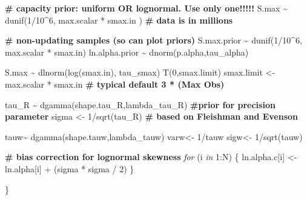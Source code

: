 \documentclass[french,11pt]{book}
\newenvironment{Shaded}{\begin{snugshade}}{\end{snugshade}}
\newcommand{\CommentTok}[1]{\textcolor[rgb]{0.56,0.35,0.01}{\textbf{#1}}}
\newcommand{\ControlFlowTok}[1]{\textcolor[rgb]{0.13,0.29,0.53}{\textit{#1}}}
\newcommand{\DecValTok}[1]{\textcolor[rgb]{0.00,0.00,0.81}{#1}}
\newcommand{\FunctionTok}[1]{\textcolor[rgb]{0.00,0.00,0.00}{#1}}
\newcommand{\NormalTok}[1]{#1}
\newcommand{\OtherTok}[1]{\textcolor[rgb]{0.56,0.35,0.01}{#1}}
\newcommand{\SpecialCharTok}[1]{\textcolor[rgb]{0.00,0.00,0.00}{#1}}
\begin{document}
\begin{Shaded}
\begin{Highlighting}[]
    \CommentTok{\# capacity prior: uniform OR lognormal. Use only one!!!!!}
\NormalTok{   S.max }\SpecialCharTok{\textasciitilde{}} \FunctionTok{dunif}\NormalTok{(}\DecValTok{1}\SpecialCharTok{/}\DecValTok{10}\SpecialCharTok{\^{}}\DecValTok{6}\NormalTok{, max.scalar }\SpecialCharTok{*}\NormalTok{ smax.in )  }\CommentTok{\# data is in millions}
    
    \CommentTok{\# non{-}updating samples (so can plot priors)}
\NormalTok{    S.max.prior }\SpecialCharTok{\textasciitilde{}} \FunctionTok{dunif}\NormalTok{(}\DecValTok{1}\SpecialCharTok{/}\DecValTok{10}\SpecialCharTok{\^{}}\DecValTok{6}\NormalTok{, max.scalar }\SpecialCharTok{*}\NormalTok{ smax.in)}
\NormalTok{    ln.alpha.prior }\SpecialCharTok{\textasciitilde{}} \FunctionTok{dnorm}\NormalTok{(p.alpha,tau\_alpha)}
    
\NormalTok{    S.max }\SpecialCharTok{\textasciitilde{}} \FunctionTok{dlnorm}\NormalTok{(}\FunctionTok{log}\NormalTok{(smax.in), tau\_smax) }\FunctionTok{T}\NormalTok{(}\DecValTok{0}\NormalTok{,smax.limit)}
\NormalTok{    smax.limit }\OtherTok{\textless{}{-}}\NormalTok{ max.scalar }\SpecialCharTok{*}\NormalTok{ smax.in }\CommentTok{\# typical default  3 * (Max Obs)}
    
\NormalTok{    tau\_R }\SpecialCharTok{\textasciitilde{}} \FunctionTok{dgamma}\NormalTok{(shape.tau\_R,lambda\_tau\_R)    }\CommentTok{\#prior for precision parameter}
\NormalTok{    sigma }\OtherTok{\textless{}{-}} \DecValTok{1}\SpecialCharTok{/}\FunctionTok{sqrt}\NormalTok{(tau\_R)          }\CommentTok{\# based on Fleishman and Evenson}

\NormalTok{    tauw}\SpecialCharTok{\textasciitilde{}} \FunctionTok{dgamma}\NormalTok{(shape.tauw,lambda\_tauw)}
\NormalTok{    varw}\OtherTok{\textless{}{-}} \DecValTok{1}\SpecialCharTok{/}\NormalTok{tauw}
\NormalTok{    sigw}\OtherTok{\textless{}{-}} \DecValTok{1}\SpecialCharTok{/}\FunctionTok{sqrt}\NormalTok{(tauw)}

   \CommentTok{\# bias correction for lognormal skewness}
    \ControlFlowTok{for}\NormalTok{ (i }\ControlFlowTok{in} \DecValTok{1}\SpecialCharTok{:}\NormalTok{N) \{  }
\NormalTok{            ln.alpha.c[i] }\OtherTok{\textless{}{-}}\NormalTok{ ln.alpha[i] }\SpecialCharTok{+}\NormalTok{ (sigma }\SpecialCharTok{*}\NormalTok{ sigma }\SpecialCharTok{/} \DecValTok{2}\NormalTok{) }
\NormalTok{    \}}
    
\NormalTok{\}}
\end{Highlighting}
\end{Shaded}
\label{BMFuns}
\end{document}
